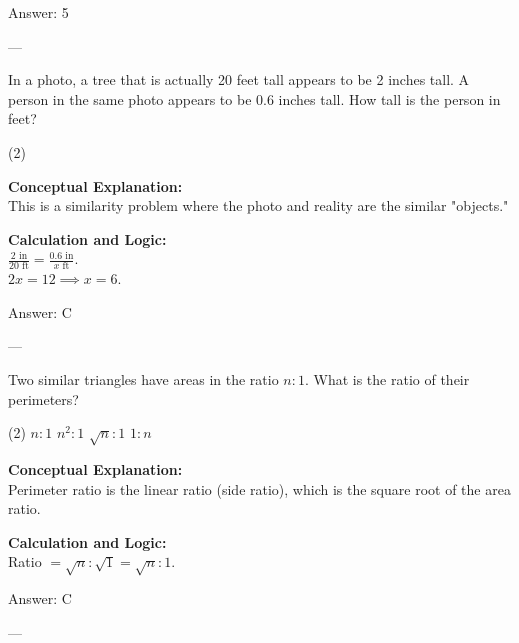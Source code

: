 \documentclass[11pt,paper=a4,answers]{exam}
\begin{document}
\begin{questions}
\begin{solution}
\vspace{15pt}
Answer: \colorbox{yellow!100}{5}
\end{solution}

---

\question
In a photo, a tree that is actually 20 feet tall appears to be 2 inches tall. A person in the same photo appears to be 0.6 inches tall. How tall is the person in feet?
\begin{tasks}(2)
\end{tasks}

\begin{solution}
\textbf{Conceptual Explanation:} \\
This is a similarity problem where the photo and reality are the similar "objects."

\vspace{10pt}
\textbf{Calculation and Logic:} \\
$\frac{2 \text{ in}}{20 \text{ ft}} = \frac{0.6 \text{ in}}{x \text{ ft}}$. \\
$2x = 12 \implies x = 6$.

\vspace{15pt}
Answer: \colorbox{yellow!100}{C}
\end{solution}

---

\question
Two similar triangles have areas in the ratio $n:1$. What is the ratio of their perimeters?
\begin{tasks}(2)
    \task $n:1$
    \task $n^2:1$
    \task $\sqrt{n}:1$
    \task $1:n$
\end{tasks}

\begin{solution}
\textbf{Conceptual Explanation:} \\
Perimeter ratio is the linear ratio (side ratio), which is the square root of the area ratio.

\vspace{10pt}
\textbf{Calculation and Logic:} \\
Ratio $= \sqrt{n} : \sqrt{1} = \sqrt{n} : 1$.

\vspace{15pt}
Answer: \colorbox{yellow!100}{C}
\end{solution}

---


\end{questions}
\end{document}
